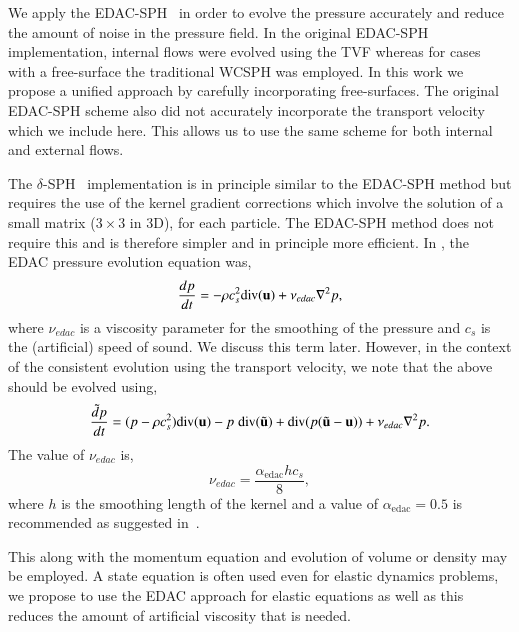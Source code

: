 We apply the EDAC-SPH~\citep{edac-sph:cf:2019} in order to evolve the pressure
accurately and reduce the amount of noise in the pressure field. In the
original EDAC-SPH implementation, internal flows were evolved using the TVF
whereas for cases with a free-surface the traditional WCSPH was employed. In
this work we propose a unified approach by carefully incorporating
free-surfaces. The original EDAC-SPH scheme also did not accurately
incorporate the transport velocity which we include here. This allows us to
use the same scheme for both internal and external flows.

The $\delta$-SPH~\citep{antuono-deltasph:cpc:2010} implementation is in
principle similar to the EDAC-SPH method but requires the use of the kernel
gradient corrections which involve the solution of a small matrix ($3 \times
3$ in 3D), for each particle. The EDAC-SPH method does not require this and is
therefore simpler and in principle more efficient. In \citep{edac-sph:cf:2019},
the EDAC pressure evolution equation was,
\begin{equation}
  \label{eq:edac-p-evolve-orig}
     \frac{d p}{d t} = -\rho c_s^2 \text{div}(\mathbf{u}) + \nu_{edac}  \nabla^2 p,
\end{equation}
where $\nu_{edac}$ is a viscosity parameter for the smoothing of the pressure
and $c_s$ is the (artificial) speed of sound. We discuss this term later.
However, in the context of the consistent evolution using the transport
velocity, we note that the above should be evolved using,
\begin{equation}
  \label{eq:edac-p-evolve}
  \frac{\tilde{d} p}{d t} =
  (p -\rho c_s^2)
    \text{div}(\mathbf{u})
  - p \; \text{div}(\tilde{\mathbf{u}})
    + \text{div}(p (\tilde{\mathbf{u}} - \mathbf{u}))
    + \nu_{edac}  \nabla^2 p.
\end{equation}
%
The value of $\nu_{edac}$ is,
\begin{equation}
  \label{eq:nu-edac}
  \nu_{edac} = \frac{\alpha_{\textrm{edac}} h c_s}{8},
\end{equation}
where $h$ is the smoothing length of the kernel and a value of
$\alpha_{\textrm{edac}}=0.5$ is recommended as suggested in~\citep{PRKP:edac-sph-iccm2015}.

This along with the momentum equation and evolution of volume or density may
be employed. A state equation is often used even for elastic dynamics
problems, we propose to use the EDAC approach for elastic equations as well as
this reduces the amount of artificial viscosity that is needed.


